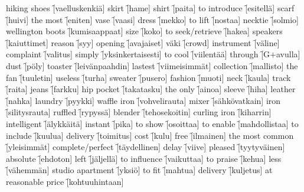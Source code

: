 \begin{questions}
  \begin{multicols}{3}
    \raggedcolumns
    \question hiking shoes \f[vaelluskenkiä]
    \question skirt        \f[hame]
    \question shirt        \f[paita]
    \question to introduce \f[esitellä]
    \question scarf        \f[huivi]
    \question the most     \f[eniten]
    \question vase         \f[vaasi]
    \question dress        \f[mekko]
    \question to lift      \f[nostaa]
    \question necktie      \f[solmio]
    \question wellington boots \f[kumisaappaat]
    \question size         \f[koko]
    \question to seek/retrieve \f[hakea]
    \question speakers         \f[kaiuttimet]
    \question reason           \f[syy]
    \question opening          \f[avajaiset]
    \question väki             \f[crowd]
    \question instrument       \f[väline]
    \question complaint        \f[valitus]
    \question simply           \f[yksinkertaisesti]
    \question to cool          \f[viilentää]
    \question through          \f[G$+$avulla]
    \question dust             \f[pöly]
    \question toaster          \f[leivänpaahdin]
    \question lastest          \f[viimeisimmät]
    \question collection       \f[mallisto]
    \question the fan          \f[tuuletin]
    \question useless          \f[turha]
    \question sweater          \f[pusero]
    \question fashion          \f[muoti]
    \question neck             \f[kaula]
    \question track            \f[raita]
    \question jeans            \f[farkku]
    \question hip pocket       \f[takatasku]
    \question the only         \f[ainoa]
    \question sleeve           \f[hiha]
    \question leather          \f[nahka]
    \question laundry          \f[pyykki]
    \question waffle iron      \f[vohvelirauta]
    \question mixer            \f[sähkövatkain]
    \question iron             \f[silitysrauta]
    \question ruffled          \f[rypyssä]
    \question blender          \f[tehosekoitin]
    \question curling iron     \f[kiharrin]
    \question intelligent      \f[älykkäitä]
    \question instant          \f[pika]
    \question to show          \f[osoittaa]
    \question to enable        \f[mahdollistaa]
    \question to include       \f[kuulua]
    \question delivery         \f[toimitus]
    \question cost             \f[kulu]
    \question free             \f[ilmainen]
    \question the most common  \f[yleisimmät]
    \question complete/perfect \f[täydellinen]
    \question delay            \f[viive]
    \question pleased          \f[tyytyväinen]
    \question absolute         \f[ehdoton]
    \question left             \f[jäljellä]
    \question to influence     \f[vaikuttaa]
    \question to praise        \f[kehua]
    \question less             \f[vähemmän]
    \question studio apartment \f[yksiö]
    \question to fit           \f[mahtua]
    \question delivery         \f[kuljetus]
    \question at reasonable price \f[kohtuuhintaan]
  \end{multicols}
\end{questions}

